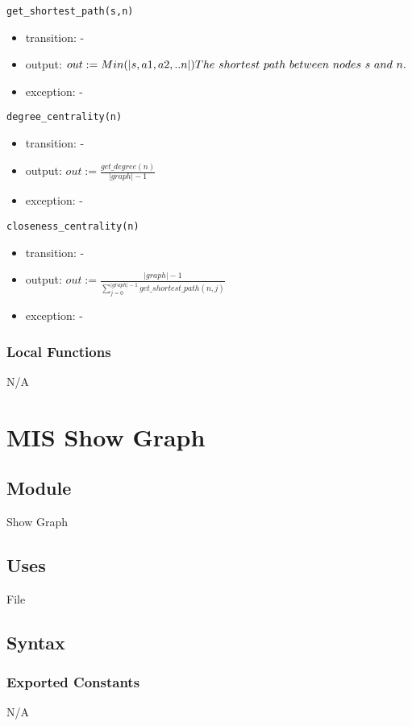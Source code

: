 \documentclass[12pt, titlepage]{article}
\begin{document}
\noindent \texttt{get\_shortest\_path(s,n)}
\begin{itemize}
\item transition: -
\item output: $out:=Min(|s,a1,a2,..n|) \\The \ shortest \ path\  between\  nodes\  s\  and \ n .$
\item exception: -   
\end{itemize}

\noindent \texttt{degree\_centrality(n)}
\begin{itemize}
\item transition: -
\item output: $out:=\frac{get\_degree(n)}{|graph| - 1}  $
\item exception: - 
\end{itemize}

\noindent \texttt{closeness\_centrality(n)}
\begin{itemize}
\item transition: -
\item output: $out:= \frac{|graph|- 1}{\sum_{j=0}^{|graph|-1}{get\_shortest\_path(n,j)}} $
\item exception: - 
\end{itemize}

\subsubsection{Local Functions}
N/A
\newpage

\section{MIS Show Graph} \label{Module} 


\subsection{Module}
Show Graph

\subsection{Uses}
File
\subsection{Syntax}

\subsubsection{Exported Constants}
N/A
\end{document}
